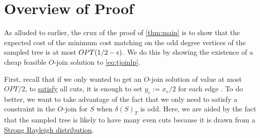 
\section{Overview of Proof}


As alluded to earlier, the crux of the proof of \cref{thm:main} is to show that the expected cost of the minimum cost matching on the odd degree vertices of the sampled tree is at most $OPT(1/2-{\epsilon})$. We do this by showing the existence of a cheap feasible $O$-join solution to \eqref{eq:tjoinlp}.

First, recall that if we only wanted to get an $O$-join solution of value at most $OPT/2$, to \hyperlink{tar:satisfy}{satisfy} all cuts, it is enough to set $y_e := x_e/2$ for each edge \cite{Wol80}.
To do better, we want to take advantage of the fact that we only need to satisfy a constraint in the $O$-join for $S$ when $\delta(S)_T$ is odd. Here, we are aided by the fact that the sampled tree is likely to have many even cuts because it is drawn from  a \hyperlink{tar:SR}{Strong Rayleigh distribution}. 



